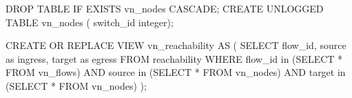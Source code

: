
\begin{sql}
DROP TABLE IF EXISTS vn_nodes CASCADE;
CREATE UNLOGGED TABLE vn_nodes (
switch_id      integer);
\end{sql}

\begin{sql}
CREATE OR REPLACE VIEW vn_reachability AS (
       SELECT flow_id,
       	      source as ingress,
       	      target as egress
       FROM reachability
       WHERE flow_id in (SELECT * FROM vn_flows) AND
       	     source in (SELECT * FROM vn_nodes) AND
	     target in (SELECT * FROM vn_nodes)
);
\end{sql}

